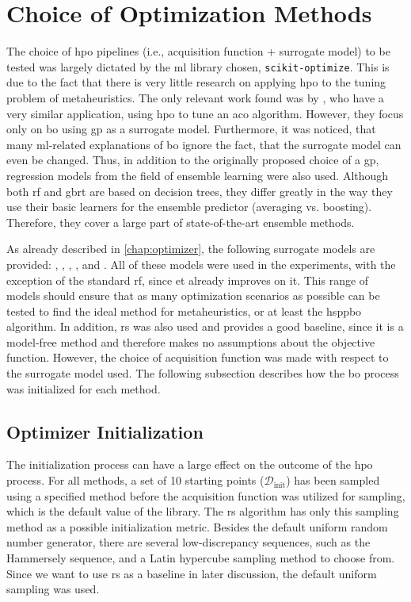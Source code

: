 \section{Choice of Optimization Methods}
\label{chap:opt-choice}

The choice of \gls{hpo} pipelines (i.e., acquisition function + surrogate model) to be tested was largely dictated by the \gls{ml} library chosen, \texttt{scikit-optimize}. This is due to the fact that there is very little research on applying \glsdesc{hpo} to the tuning problem of metaheuristics. The only relevant work found was by \citet{yin2021bayesian}, who have a very similar application, using \gls{hpo} to tune an \glsdesc{aco} algorithm. However, they focus only on \gls{bo} using \gls{gp} as a surrogate model. Furthermore, it was noticed, that many \gls{ml}-related explanations of \gls{bo} ignore the fact, that the surrogate model can even be changed. Thus, in addition to the originally proposed choice of a \glsdesc{gp}, regression models from the field of ensemble learning were also used. Although both \glsdesc{rf} and \glsdesc{gbrt} are based on decision trees, they differ greatly in the way they use their basic learners for the ensemble predictor (averaging vs. boosting). Therefore, they cover a large part of state-of-the-art ensemble methods.

As already described in \cref{chap:optimizer}, the following surrogate models are provided: , , , , and .
All of these models were used in the experiments, with the exception of the standard \gls{rf}, since \gls{et} already improves on it. This range of models should ensure that as many optimization scenarios as possible can be tested to find the ideal method for metaheuristics, or at least the \gls{hsppbo} algorithm. In addition, \gls{rs} was also used and provides a good baseline, since it is a model-free method and therefore makes no assumptions about the objective function. However, the choice of acquisition function was made with respect to the surrogate model used. The following subsection describes how the \gls{bo} process was initialized for each method.

\subsection{Optimizer Initialization}
\label{chap:opt-init}
The initialization process can have a large effect on the outcome of the \gls{hpo} process. For all methods, a set of 10 starting points ($\mathcal{D}_\text{init}$) has been sampled using a specified method before the acquisition function was utilized for sampling, which is the default value of the library. The \gls{rs} algorithm has only this sampling method as a possible initialization metric. Besides the default uniform random number generator, there are several low-discrepancy sequences, such as the Hammersely sequence, and a Latin hypercube sampling method to choose from. Since we want to use \gls{rs} as a baseline in later discussion, the default uniform sampling was used.

